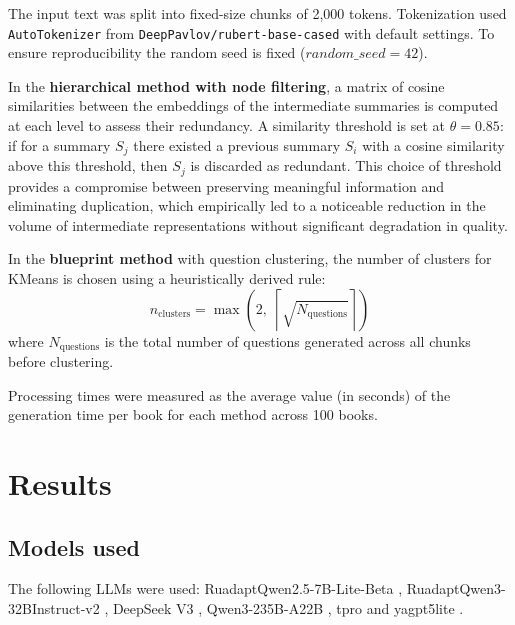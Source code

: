 \documentclass{superfri}
\begin{document}
The input text was split into fixed-size chunks of 2{,}000 tokens.
Tokenization used \texttt{AutoTokenizer} from \texttt{DeepPavlov/rubert-base-cased} with default settings.
To ensure reproducibility the random seed is fixed ($random\_seed = 42$).

In the \textbf{hierarchical method with node filtering}, a matrix of cosine similarities between the embeddings of the intermediate summaries is computed at each level to assess their redundancy.
A similarity threshold is set at $\theta=0.85$: if for a summary $S_j$ there existed a previous summary $S_i$ with a cosine similarity above this threshold, then $S_j$ is discarded as redundant. 
This choice of threshold provides a compromise between preserving meaningful information and eliminating duplication, which empirically led to a noticeable reduction in the volume of intermediate representations without significant degradation in quality.

In the \textbf{blueprint method} with question clustering, the number of clusters for KMeans is chosen using a heuristically derived rule:
\begin{equation}
  n_{\text{clusters}} = \max\!\left(2,\; \left\lceil \sqrt{N_{\text{questions}}} \right\rceil\right)
\end{equation}
where $N_{\text{questions}}$ is the total number of questions generated across all chunks before clustering.

Processing times were measured as the average value (in seconds) of the generation time per book for each method across 100 books.

\section{Results}

\subsection{Models used}
The following LLMs were used:
RuadaptQwen2.5-7B-Lite-Beta \cite{ruadapt},
RuadaptQwen3-32BInstruct-v2 \cite{ruadapt},
DeepSeek V3 \cite{deepseek},
Qwen3-235B-A22B \cite{qwen3},
tpro \cite{tpro} and yagpt5lite \cite{yagpt}.
\end{document}
